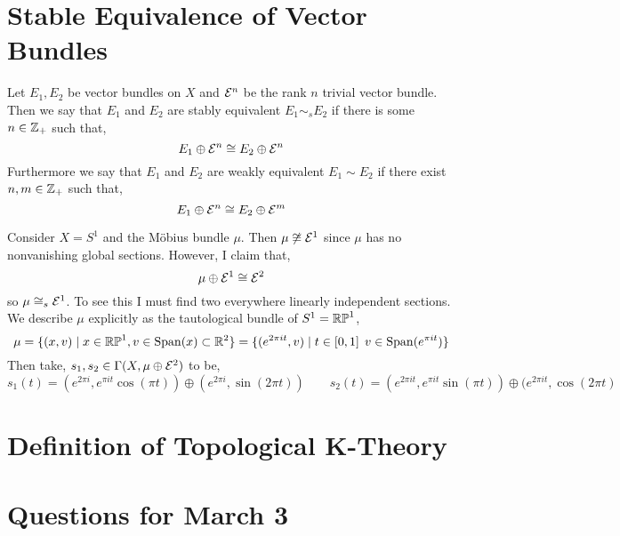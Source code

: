 \documentclass[12pt]{extarticle}
\newcommand{\R}{\mathbb{R}}
\begin{document}
\section{Stable Equivalence of Vector Bundles}

\begin{definition}
Let $E_1, E_2$ be vector bundles on $X$ and $\mathcal{E}^n$ be the rank $n$ trivial vector bundle. Then we say that $E_1$ and $E_2$ are stably equivalent $E_1 \sim_s E_2$ if there is some $n \in \mathbb{Z}_+$ such that,
\[ E_1 \oplus \mathcal{E}^n \cong E_2 \oplus \mathcal{E}^n \]
Furthermore we say that $E_1$ and $E_2$ are weakly equivalent $E_1 \sim E_2$ if there exist $n,m \in \mathbb{Z}_+$ such that,
\[ E_1 \oplus \mathcal{E}^n \cong E_2 \oplus \mathcal{E}^m \]
\end{definition}

\begin{example}
Consider $X = S^1$ and the M\"{o}bius bundle $\mu$. Then $\mu \not\cong \mathcal{E}^1$ since $\mu$ has no nonvanishing global sections. However, I claim that,
\[ \mu \oplus \mathcal{E}^1 \cong \mathcal{E}^2 \]
so $\mu \cong_s \mathcal{E}^1$. To see this I must find two everywhere linearly independent sections. 
\bigskip\\
We describe $\mu$ explicitly as the tautological bundle of $S^1 = \mathbb{RP}^1$,
\[ \mu = \{ (x, v) \mid x \in \RP^1, v \in \mathrm{Span}(x) \subset \R^2 \} = \{ (e^{2 \pi i t}, v) \mid t \in [0, 1] \: \: v \in \mathrm{Span}(e^{\pi i t}) \} \]
Then take, $s_1, s_2 \in \Gamma(X, \mu \oplus \mathcal{E}^2)$ to be,
\[ s_1(t) = (e^{2 \pi i}, e^{\pi i t} \cos{(\pi t)}) \oplus (e^{2 \pi i}, \sin{(2 \pi t)}) \quad \quad s_2(t) = (e^{2 \pi i t}, e^{\pi i t} \sin{(\pi t)}) \oplus (e^{2 \pi i t}, \cos{(2 \pi t)}  \]
\end{example}

\section{Definition of Topological K-Theory}


\section{Questions for March 3}
\end{document}
